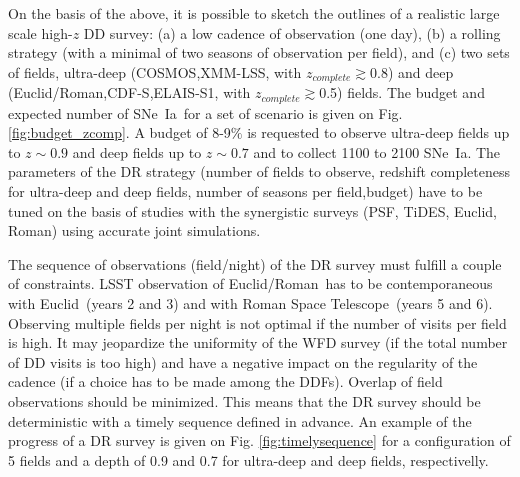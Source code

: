 \documentclass[skiphelvet,twocolumn]{aastex63}
\newcommand{\cosmos}{{COSMOS}}
\newcommand{\elais}{{ELAIS-S1}}
\newcommand{\xmm}{{XMM-LSS}}
\newcommand{\cdfs}{{CDF-S}}
\newcommand{\adfs}{{Euclid/Roman}}
\newcommand{\euclid}{{Euclid}}
\newcommand{\romanspace}{{Roman Space Telescope}}
\newcommand{\sne}{{SNe~Ia}}
\newcommand{\zcomp}{\mbox{$z_{complete}$}}
\begin{document}
\par
On the basis of the above, it is possible to sketch the outlines of a realistic large scale high-$z$ DD survey: (a) a low cadence of observation (one day), (b) a rolling strategy (with a minimal of two seasons of observation per field), and (c) two sets of fields, ultra-deep (\cosmos,\xmm, with \zcomp$\gtrsim$0.8) and deep (\adfs,\cdfs,\elais, with \zcomp$\gtrsim$0.5) fields. The budget and expected number of \sne~for a set of scenario is given on Fig. \ref{fig:budget_zcomp}. A budget of 8-9$\%$ is requested to observe ultra-deep fields up to $z\sim0.9$ and deep fields up to $z\sim0.7$ and to collect 1100 to 2100 \sne. The parameters of the DR strategy (number of fields to observe, redshift completeness for ultra-deep and deep fields, number of seasons per field,budget) have to be tuned on the basis of studies with the synergistic surveys (PSF, TiDES, Euclid, Roman) using accurate joint simulations.
\par
The sequence of observations (field/night) of the DR survey must fulfill a couple of constraints. LSST observation of \adfs~has to be contemporaneous with \euclid~(years 2 and 3) and with \romanspace~(years 5 and 6). Observing multiple fields per night is not optimal if the number of visits per field is high. It may jeopardize the uniformity of the WFD survey (if the total number of DD visits is too high) and have a negative impact on the regularity of the cadence (if a choice has to be made among the DDFs). Overlap of field observations should be minimized. This means that the DR survey should be deterministic with a timely sequence defined in advance. An example of the progress of a DR survey is given on Fig. \ref{fig:timelysequence} for a configuration of 5 fields and a depth of 0.9 and 0.7 for ultra-deep and deep fields, respectivelly. 
\end{document}

